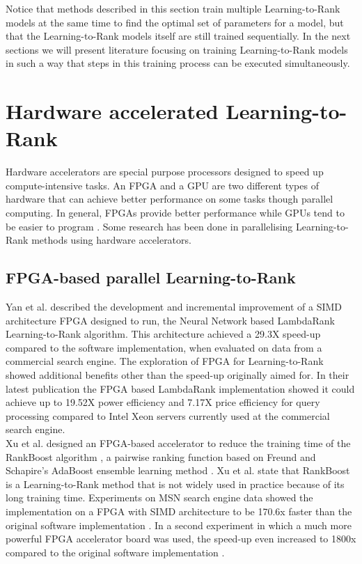 Notice that methods described in this section train multiple Learning-to-Rank models at the same time to find the optimal set of parameters for a model, but that the Learning-to-Rank models itself are still trained sequentially. In the next sections we will present literature focusing on training Learning-to-Rank models in such a way that steps in this training process can be executed simultaneously.\\

\section{Hardware accelerated Learning-to-Rank}
Hardware accelerators are special purpose processors designed to speed up compute-intensive tasks. An \ac{FPGA} and a \ac{GPU} are two different types of hardware that can achieve better performance on some tasks though parallel computing. In general, \ac{FPGA}s provide better performance while \ac{GPU}s tend to be easier to program \cite{Che2008}. Some research has been done in parallelising Learning-to-Rank methods using hardware accelerators.

\subsection{FPGA-based parallel Learning-to-Rank}
Yan et al. \cite{Yan2009,Yan2010,Yan2011,Yan2012} described the development and incremental improvement of a \ac{SIMD} architecture \ac{FPGA} designed to run, the Neural Network based LambdaRank Learning-to-Rank algorithm. This architecture achieved a 29.3X speed-up compared to the software implementation, when evaluated on data from a commercial search engine. The exploration of \ac{FPGA} for Learning-to-Rank showed additional benefits other than the speed-up originally aimed for. In their latest publication \cite{Yan2012} the \ac{FPGA} based LambdaRank implementation showed it could achieve up to 19.52X power efficiency and 7.17X price efficiency for query processing compared to Intel Xeon servers currently used at the commercial search engine.\\

Xu et al. \cite{Xu2007b,Xu2009} designed an \ac{FPGA}-based accelerator to reduce the training time of the RankBoost algorithm \cite{Freund2003}, a pairwise ranking function based on Freund and Schapire's AdaBoost ensemble learning method \cite{Freund1997}. Xu et al. \cite{Xu2009} state that RankBoost is a Learning-to-Rank method that is not widely used in practice because of its long training time. Experiments on MSN search engine data showed the implementation on a \ac{FPGA} with \ac{SIMD} architecture to be 170.6x faster than the original software implementation \cite{Xu2007b}. In a second experiment in which a much more powerful \ac{FPGA} accelerator board was used, the speed-up even increased to 1800x compared to the original software implementation \cite{Xu2009}.\\

